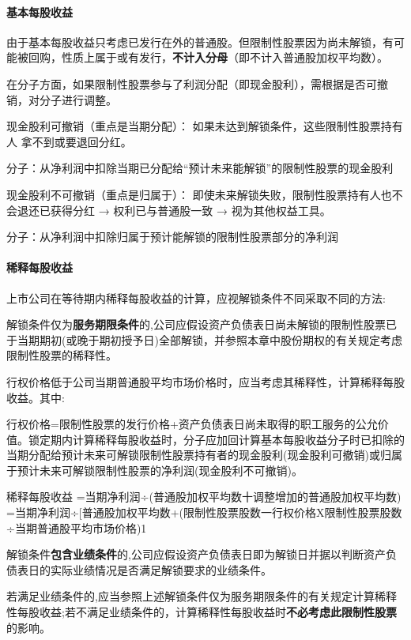 \documentclass[UTF8,12pt]{ctexart}
\numberwithin{equation}{section} %
\numberwithin{figure}{section}
\numberwithin{table}{section}
\begin{document}
	\paragraph{基本每股收益}
	
	由于基本每股收益只考虑已发行在外的普通股。但限制性股票因为尚未解锁，有可能被回购，性质上属于或有发行，\textbf{不计入分母}（即不计入普通股加权平均数）。
	
	在分子方面，如果限制性股票参与了利润分配（即现金股利），需根据是否可撤销，对分子进行调整。
	
	现金股利可撤销（重点是当期分配）：
	如果未达到解锁条件，这些限制性股票持有人 拿不到或要退回分红。
	
	分子：从净利润中扣除当期已分配给“预计未来能解锁”的限制性股票的现金股利
	

	现金股利不可撤销（重点是归属于）：
	即使未来解锁失败，限制性股票持有人也不会退还已获得分红 → 权利已与普通股一致 → 视为其他权益工具。
	
	分子：从净利润中扣除归属于预计能解锁的限制性股票部分的净利润
	
	\paragraph{稀释每股收益}
	
	上市公司在等待期内稀释每股收益的计算，应视解锁条件不同采取不同的方法:
	
	解锁条件仅为\textbf{服务期限条件}的,公司应假设资产负债表日尚未解锁的限制性股票已于当期期初(或晚于期初授予日)全部解锁，并参照本章中股份期权的有关规定考虑限制性股票的稀释性。
	
	行权价格低于公司当期普通股平均市场价格时，应当考虑其稀释性，计算稀释每股收益。其中:
	
	行权价格=限制性股票的发行价格+资产负债表日尚未取得的职工服务的公允价值。锁定期内计算稀释每股收益时，分子应加回计算基本每股收益分子时已扣除的当期分配给预计未来可解锁限制性股票持有者的现金股利(现金股利可撤销)或归属于预计未来可解锁限制性股票的净利润(现金股利不可撤销)。
	
	稀释每股收益
	=当期净利润÷(普通股加权平均数十调整增加的普通股加权平均数)
	=当期净利润÷[普通股加权平均数+(限制性股票股数一行权价格X限制性股票股数÷当期普通股平均市场价格)1
	
	解锁条件\textbf{包含业绩条件}的,公司应假设资产负债表日即为解锁日并据以判断资产负债表日的实际业绩情况是否满足解锁要求的业绩条件。
	
	若满足业绩条件的,应当参照上述解锁条件仅为服务期限条件的有关规定计算稀释性每股收益;若不满足业绩条件的，计算稀释性每股收益时\textbf{不必考虑此限制性股票}的影响。
\end{document}
